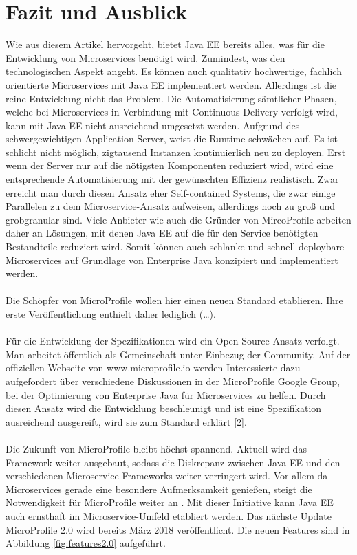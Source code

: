 \section{Fazit und Ausblick}
Wie aus diesem Artikel hervorgeht, bietet Java EE bereits alles, was für die Entwicklung von Microservices benötigt wird. Zumindest, was den technologischen Aspekt angeht. Es können auch qualitativ hochwertige, fachlich orientierte Microservices mit Java EE implementiert werden. Allerdings ist die reine Entwicklung nicht das Problem. Die Automatisierung sämtlicher Phasen, welche bei Microservices in Verbindung mit Continuous Delivery verfolgt wird, kann mit Java EE nicht ausreichend umgesetzt werden. Aufgrund des schwergewichtigen Application Server, weist die Runtime schwächen auf. Es ist schlicht nicht möglich, zigtausend Instanzen kontinuierlich neu zu deployen. Erst wenn der Server nur auf die nötigsten Komponenten reduziert wird, wird eine entsprechende Automatisierung mit der gewünschten Effizienz realistisch. Zwar erreicht man durch diesen Ansatz eher Self-contained Systems, die zwar einige Parallelen zu dem Microservice-Ansatz aufweisen, allerdings noch zu groß und grobgranular sind. Viele Anbieter wie auch die Gründer von MircoProfile arbeiten daher an Lösungen, mit denen Java EE auf die für den Service benötigten Bestandteile reduziert wird. Somit können auch schlanke und schnell deploybare Microservices auf Grundlage von Enterprise Java konzipiert und implementiert werden.\\ \\
Die Schöpfer von MicroProfile wollen hier einen neuen Standard etablieren. Ihre erste Veröffentlichung enthielt daher lediglich (…). \\ \\
Für die Entwicklung der Spezifikationen wird ein Open Source-Ansatz verfolgt. Man arbeitet öffentlich als Gemeinschaft unter Einbezug der Community. Auf der offiziellen Webseite von www.microprofile.io werden Interessierte dazu aufgefordert über verschiedene Diskussionen in der MicroProfile Google Group, bei der Optimierung von Enterprise Java für Microservices zu helfen. Durch diesen Ansatz wird die Entwicklung beschleunigt und ist eine Spezifikation ausreichend ausgereift, wird sie zum Standard erklärt [2].  \\ \\
Die Zukunft von MicroProfile bleibt höchst spannend. Aktuell wird das Framework weiter ausgebaut, sodass die Diskrepanz zwischen Java-EE und den verschiedenen Microservice-Frameworks weiter verringert wird. Vor allem da Microservices gerade eine besondere Aufmerksamkeit genießen, steigt die Notwendigkeit für MicroProfile weiter an \cite{LarsRowekamp.2018}. Mit dieser Initiative kann Java EE auch ernsthaft im Microservice-Umfeld etabliert werden. Das nächste Update MicroProfile 2.0 wird bereits März 2018 veröffentlicht. Die neuen Features sind in Abbildung \ref{fig:features2.0} aufgeführt. 


